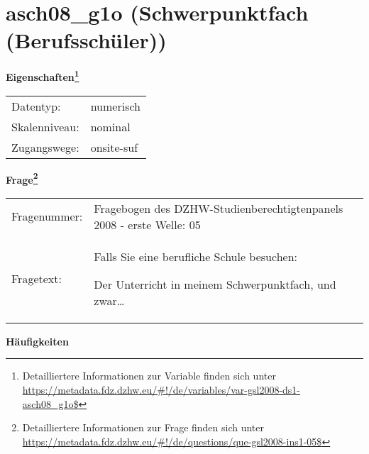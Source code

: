 
    \setcounter{footnote}{0}

    \vspace*{-1.8cm}
	\section{asch08\_g1o (Schwerpunktfach (Berufsschüler))}
	\label{section:asch08_g1o}



    \vspace*{0.5cm}
    \noindent\textbf{Eigenschaften\footnote{Detailliertere Informationen zur Variable finden sich unter
		\url{https://metadata.fdz.dzhw.eu/\#!/de/variables/var-gsl2008-ds1-asch08_g1o$}}}\\
	\begin{tabularx}{\hsize}{@{}lX}
	Datentyp: & numerisch \\
	Skalenniveau: & nominal \\
	Zugangswege: &
	  onsite-suf
 \\
    \end{tabularx}



				\vspace*{0.5cm}
                \noindent\textbf{Frage\footnote{Detailliertere Informationen zur Frage finden sich unter
		              \url{https://metadata.fdz.dzhw.eu/\#!/de/questions/que-gsl2008-ins1-05$}}}\\
				\begin{tabularx}{\hsize}{@{}lX}
					Fragenummer: &
					  Fragebogen des DZHW-Studienberechtigtenpanels 2008 - erste Welle:
					  05
 \\
					Fragetext: & Falls Sie eine berufliche Schule besuchen:\par  Der Unterricht in meinem Schwerpunktfach, und zwar… \\
				\end{tabularx}





        		\vspace*{0.5cm}
                \noindent\textbf{Häufigkeiten}

